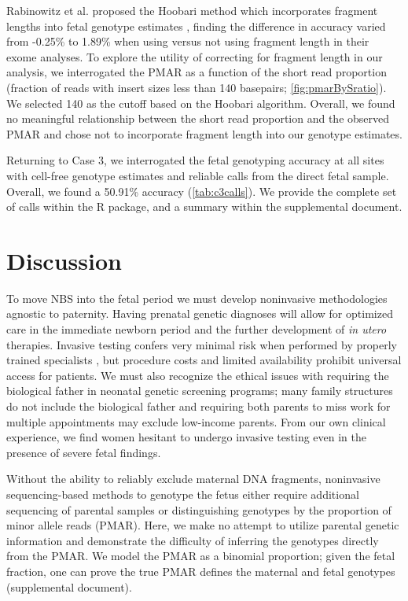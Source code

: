 \documentclass{article}\usepackage[]{graphicx}\usepackage[]{color}
\begin{document}
Rabinowitz et al. proposed the Hoobari method which incorporates fragment lengths into fetal genotype estimates \cite{rabinowitz:2019aa}, finding the difference in accuracy varied from -0.25\% to 1.89\% when using versus not using fragment length in their exome analyses.
To explore the utility of correcting for fragment length in our analysis, we interrogated the PMAR as a function of the short read proportion (fraction of reads with insert sizes less than 140 basepairs; \cref{fig:pmarBySratio}).
We selected 140 as the cutoff based on the Hoobari algorithm.
Overall, we found no meaningful relationship between the short read proportion and the observed PMAR and chose not to incorporate fragment length into our genotype estimates.

Returning to Case 3, we interrogated the fetal genotyping accuracy at all sites with cell-free genotype estimates and reliable calls from the direct fetal sample.
Overall, we found a 50.91\% accuracy (\cref{tab:c3calls}).
We provide the complete set of calls within the R package, and a summary within the supplemental document.

\section{Discussion}

To move NBS into the fetal period we must develop noninvasive methodologies agnostic to paternity.
Having prenatal genetic diagnoses will allow for optimized care in the immediate newborn period and the further development of \emph{in utero} therapies.
Invasive testing confers very minimal risk when performed by properly trained specialists \cite{salomon:2019aa}, but procedure costs and limited availability prohibit universal access for patients.
We must also recognize the ethical issues with requiring the biological father in neonatal genetic screening programs; many family structures do not include the biological father and requiring both parents to miss work for multiple appointments may exclude low-income parents.
From our own clinical experience, we find women hesitant to undergo invasive testing even in the presence of severe fetal findings.

Without the ability to reliably exclude maternal DNA fragments, noninvasive sequencing-based methods to genotype the fetus either require additional sequencing of parental samples or distinguishing genotypes by the proportion of minor allele reads (PMAR).
Here, we make no attempt to utilize parental genetic information and demonstrate the difficulty of inferring the genotypes directly from the PMAR.
We model the PMAR as a binomial proportion; given the fetal fraction, one can prove the true PMAR defines the maternal and fetal genotypes (supplemental document).
\end{document}

